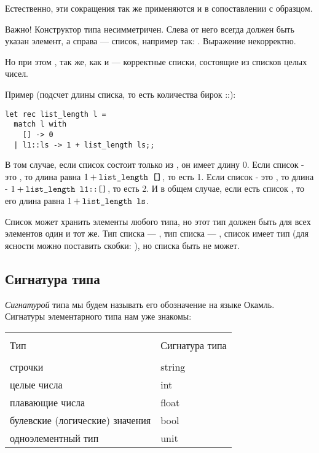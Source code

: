 Естественно, эти сокращения так же применяются и в сопоставлении с образцом.

Важно! Конструктор типа \s{::} несимметричен. Слева от него всегда должен
быть указан элемент, а справа --- список, например так: . 
Выражение  некорректно.

Но при этом \s{[1]::[[1]]}, так же, как и \s{[1]::[]} --- корректные списки,
состоящие из списков целых чисел.

Пример (подсчет длины списка, то есть количества бирок ::):

\begin{verbatim}
let rec list_length l =
  match l with
    [] -> 0
  | l1::ls -> 1 + list_length ls;;
\end{verbatim}

В том случае, если список состоит только из \s{[]}, он имеет длину 0.
Если список - это , то длина равна $1 + \texttt{list\_length\ []}$, то есть 1.
Если список - это , то длина - $1 + \texttt{list\_length\ l1::[]}$, то есть 2.
И в общем случае, если есть список , то его длина равна
$1 + \texttt{list\_length\ ls}$.

Список может хранить элементы любого типа, но этот тип должен быть
для всех элементов один и тот же.
Тип списка \s{[1;2;3]} --- , тип списка \s{["1";"a";"c"]} --- 
,
список \s{[[1];[2];[]]} имеет тип  (для ясности можно поставить
скобки: ), но списка \s{[1;"2"]} быть не может.




\subsection{Сигнатура типа}

\emph{Сигнатурой} типа мы будем называть его обозначение на языке Окамль.
Сигнатуры элементарного типа нам уже знакомы:

\begin{tabular}{ll}
\hline\\
Тип&Сигнатура типа\\
\hline\\
строчки            &string\\
целые числа        &int\\
плавающие числа    &float\\
булевские (логические) значения &bool\\
одноэлементный тип &unit\\
\hline
\end{tabular}

